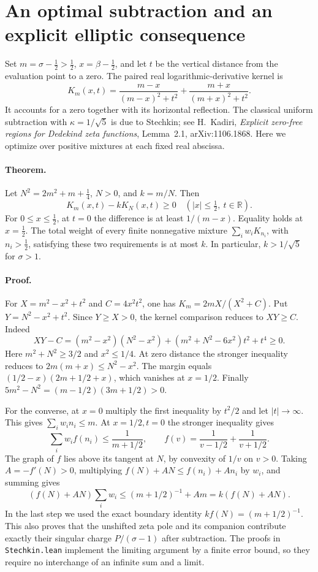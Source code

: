 \section{An optimal subtraction and an explicit elliptic consequence}

Set $m=\sigma-\tfrac12>\tfrac12$, $x=\beta-\tfrac12$, and let $t$ be the vertical distance from the evaluation point to a zero. The paired real logarithmic-derivative kernel is
\[
 K_m(x,t)=\frac{m-x}{(m-x)^2+t^2}
             +\frac{m+x}{(m+x)^2+t^2}.
\]
It accounts for a zero together with its horizontal reflection. The classical uniform subtraction with $\kappa=1/\sqrt5$ is due to Stechkin; see H.~Kadiri, \emph{Explicit zero-free regions for Dedekind zeta functions}, Lemma~2.1, arXiv:1106.1868. Here we optimize over positive mixtures at each fixed real abscissa.

\paragraph{Theorem.}
Let $N^2=2m^2+m+\tfrac14$, $N>0$, and $k=m/N$. Then
\[
 K_m(x,t)-kK_N(x,t)\ge0
 \quad (|x|\le\tfrac12,\ t\in\mathbb R).
\]
For $0\le x\le\tfrac12$, at $t=0$ the difference is at least $1/(m-x)$. Equality holds at $x=\tfrac12$. The total weight of every finite nonnegative mixture $\sum_i w_iK_{n_i}$, with $n_i>\tfrac12$, satisfying these two requirements is at most $k$. In particular, $k>1/\sqrt5$ for $\sigma>1$.

\paragraph{Proof.}
For $X=m^2-x^2+t^2$ and $C=4x^2t^2$, one has $K_m=2mX/(X^2+C)$. Put $Y=N^2-x^2+t^2$. Since $Y\ge X>0$, the kernel comparison reduces to $XY\ge C$. Indeed
\[
 XY-C=(m^2-x^2)(N^2-x^2)+(m^2+N^2-6x^2)t^2+t^4\ge0.
\]
Here $m^2+N^2\ge3/2$ and $x^2\le1/4$. At zero distance the stronger inequality reduces to $2m(m+x)\le N^2-x^2$. The margin equals $(1/2-x)(2m+1/2+x)$, which vanishes at $x=1/2$. Finally $5m^2-N^2=(m-1/2)(3m+1/2)>0$.

For the converse, at $x=0$ multiply the first inequality by $t^2/2$ and let $|t|\to\infty$. This gives $\sum_i w_i n_i\le m$. At $x=1/2,t=0$ the stronger inequality gives
\[
 \sum_i w_i f(n_i)\le \frac1{m+1/2},\qquad
 f(v)=\frac1{v-1/2}+\frac1{v+1/2}.
\]
The graph of $f$ lies above its tangent at $N$, by convexity of $1/v$ on $v>0$. Taking $A=-f'(N)>0$, multiplying $f(N)+AN\le f(n_i)+An_i$ by $w_i$, and summing gives
\[
 (f(N)+AN)\sum_iw_i\le(m+1/2)^{-1}+Am=k(f(N)+AN).
\]
In the last step we used the exact boundary identity $kf(N)=(m+1/2)^{-1}$. This also proves that the unshifted zeta pole and its companion contribute exactly their singular charge $P/(\sigma-1)$ after subtraction. The proofs in \texttt{Stechkin.lean} implement the limiting argument by a finite error bound, so they require no interchange of an infinite sum and a limit.

